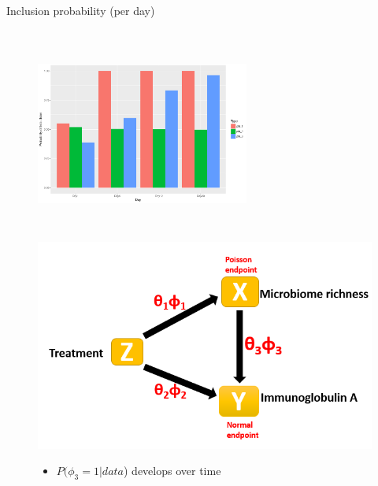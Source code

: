 \documentclass[a4paper,9pt]{beamer}
\begin{document}
\begin{frame}{\huge{Inclusion probability (per day)}}
\begin{figure}[H]
\begin{minipage}{0.5\textwidth}
\includegraphics[scale=0.3,height=7cm,width=7cm]{ind.pdf}
\end{minipage}
\hfill
\begin{minipage}{0.3\textwidth}
\centering
\includegraphics[scale=0.3]{hm.PNG}
\begin{itemize}
\small
\item $P(\phi_3=1|data$) develops over time
\end{itemize}
\end{minipage}
\end{figure}
\end{frame}


\end{document}
